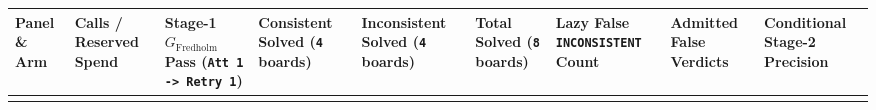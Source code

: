 \documentclass[
  11pt,
]{article}
\newcommand{\passthrough}[1]{#1}
\begin{document}
\begingroup\begin{landscape}\small
\begin{longtable}[]{@{}
  >{\raggedright\arraybackslash}p{}
  >{\raggedright\arraybackslash}p{}
  >{\raggedright\arraybackslash}p{}
  >{\raggedright\arraybackslash}p{}
  >{\raggedright\arraybackslash}p{}
  >{\raggedright\arraybackslash}p{}
  >{\raggedright\arraybackslash}p{}
  >{\raggedright\arraybackslash}p{}
  >{\raggedright\arraybackslash}p{}@{}}
\toprule\noalign{}
\begin{minipage}[b]{\linewidth}\raggedright
Panel \& Arm
\end{minipage} & \begin{minipage}[b]{\linewidth}\raggedright
Calls / Reserved Spend
\end{minipage} & \begin{minipage}[b]{\linewidth}\raggedright
Stage-1 \(G_{\text{Fredholm}}\) Pass
(\passthrough{\lstinline!Att 1 -> Retry 1!})
\end{minipage} & \begin{minipage}[b]{\linewidth}\raggedright
Consistent Solved (\passthrough{\lstinline!4!} boards)
\end{minipage} & \begin{minipage}[b]{\linewidth}\raggedright
Inconsistent Solved (\passthrough{\lstinline!4!} boards)
\end{minipage} & \begin{minipage}[b]{\linewidth}\raggedright
Total Solved (\passthrough{\lstinline!8!} boards)
\end{minipage} & \begin{minipage}[b]{\linewidth}\raggedright
Lazy False \passthrough{\lstinline!INCONSISTENT!} Count
\end{minipage} & \begin{minipage}[b]{\linewidth}\raggedright
Admitted False Verdicts
\end{minipage} & \begin{minipage}[b]{\linewidth}\raggedright
Conditional Stage-2 Precision
\end{minipage} \\
\midrule\noalign{}
\endhead

\end{longtable}
\end{landscape}
\end{document}
